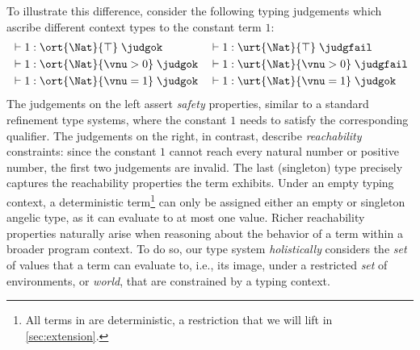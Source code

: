 
To illustrate this difference, consider the following typing
judgements which ascribe different context types to the constant term
$1$:
\begin{align*}
  &\vdash 1 : \ort{\Nat}{\top}\;\judgok
  && \vdash 1 : \urt{\Nat}{\top}\;\judgfail
  \\&\vdash 1 : \ort{\Nat}{\vnu > 0}\;\judgok
  && \vdash 1 : \urt{\Nat}{\vnu > 0}\;\judgfail
  \\&\vdash 1 : \ort{\Nat}{\vnu = 1}\;\judgok
  && \vdash 1 : \urt{\Nat}{\vnu = 1}\;\judgok
\end{align*}\noindent
The judgements on the left assert \emph{safety} properties, similar to
a standard refinement type systems, where the constant $1$ needs to
satisfy the corresponding qualifier. The judgements on the right, in
contrast, describe \emph{reachability} constraints: since the constant
$1$ cannot reach every natural number or positive number, the first
two judgements are invalid. The last (singleton) type precisely
captures the reachability properties the term exhibits. Under an empty
typing context, a deterministic term\footnote{All terms in \langname{}
  are deterministic, a restriction that we will lift in
  \autoref{sec:extension}.} can only be assigned either an empty or
singleton angelic type, as it can evaluate to at most one
value. Richer reachability properties naturally arise when reasoning
about the behavior of a term within a broader program context. To do
so, our type system \emph{holistically} considers the \emph{set} of
values that a term can evaluate to, i.e., its image, under a
restricted \emph{set} of environments, or \emph{world}, that are
constrained by a typing context.

